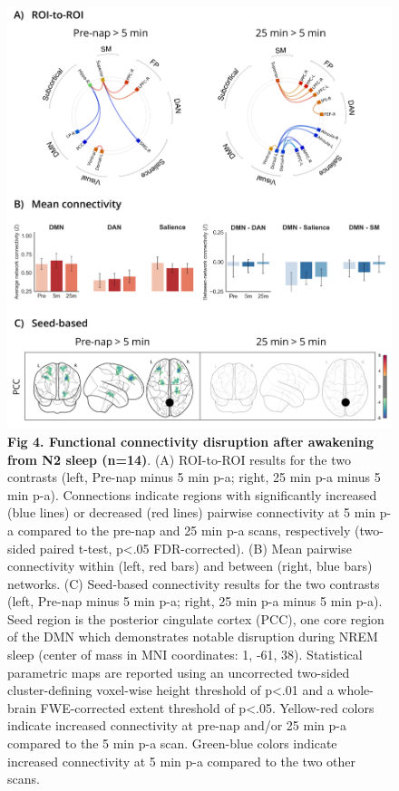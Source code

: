 \begin{figure}[htb!]
	\includegraphics[width=\textwidth]{Fig/Results/Inertia/Inertia/Fig4_N2.png}
	\caption*{\textbf{Fig 4. Functional connectivity disruption after awakening from N2 sleep (n=14)}. (A) ROI-to-ROI results for the two contrasts (left, Pre-nap minus 5 min p-a; right, 25 min p-a minus 5 min p-a). Connections indicate regions with significantly increased (blue lines) or decreased (red lines) pairwise connectivity at 5 min p-a compared to the pre-nap and 25 min p-a scans, respectively (two-sided paired t-test, p<.05 FDR-corrected). (B) Mean pairwise connectivity within (left, red bars) and between (right, blue bars) networks. (C) Seed-based connectivity results for the two contrasts (left, Pre-nap minus 5 min p-a; right, 25 min p-a minus 5 min p-a). Seed region is the posterior cingulate cortex (PCC), one core region of the DMN which demonstrates notable disruption during NREM sleep (center of mass in MNI coordinates: 1, -61, 38). Statistical parametric maps are reported using an uncorrected two-sided cluster-defining voxel-wise height threshold of p<.01 and a whole-brain FWE-corrected extent threshold of p<.05. Yellow-red colors indicate increased connectivity at pre-nap and/or 25 min p-a compared to the 5 min p-a scan. Green-blue colors indicate increased connectivity at 5 min p-a compared to the two other scans.}
\end{figure}

